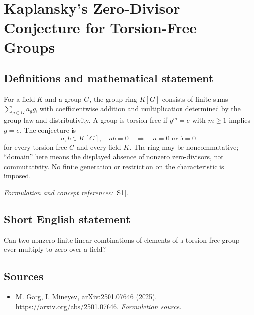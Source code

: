 \documentclass[11pt]{article}
\begin{document}
\section*{\texorpdfstring{Kaplansky's Zero-Divisor Conjecture for Torsion-Free Groups}{Kaplansky's Zero-Divisor Conjecture for Torsion-Free Groups}}\label{204}
\subsection{Definitions and mathematical statement}
For a field $K$ and a group $G$, the group ring $K[G]$ consists of finite sums $\sum_{g\in G}a_gg$, with coefficientwise addition and multiplication determined by the group law and distributivity. A group is torsion-free if $g^m=e$ with $m\ge1$ implies $g=e$. The conjecture is
\[
 a,b\in K[G],\quad ab=0\quad\Longrightarrow\quad a=0\text{ or }b=0
\]
for every torsion-free $G$ and every field $K$. The ring may be noncommutative; ``domain'' here means the displayed absence of nonzero zero-divisors, not commutativity. No finite generation or restriction on the characteristic is imposed.
\par\smallskip\textit{Formulation and concept references:} \href{https://arxiv.org/abs/2501.07646}{[S1]}.

\subsection{Short English statement}
Can two nonzero finite linear combinations of elements of a torsion-free group ever multiply to zero over a field?
\subsection{Sources}
\begin{itemize}
\item[S1]M. Garg, I. Mineyev, arXiv:2501.07646 (2025).
\url{https://arxiv.org/abs/2501.07646}.
\textit{Formulation source.}
\end{itemize}
\end{document}
